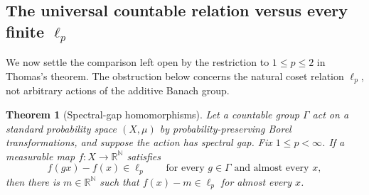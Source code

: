 \documentclass[11pt]{article}
\numberwithin{equation}{section}
\newtheorem{theorem}{Theorem}[section]
\theoremstyle{definition}
\newcommand{\N}{\mathbb N}
\newcommand{\R}{\mathbb R}
\begin{document}
\subsection{The universal countable relation versus every finite \texorpdfstring{$\ell_p$}{ell p}}
\label{sec:finite-p}

We now settle the comparison left open by the restriction to
$1\le p\le2$ in Thomas's theorem. The obstruction below concerns
the natural coset relation $\ell_p$, not arbitrary actions of
the additive Banach group.

\begin{theorem}[Spectral-gap homomorphisms]\label{thm:spectral-homomorphism}
Let a countable group $\Gamma$ act on a standard probability space
$(X,\mu)$ by probability-preserving Borel transformations, and suppose
the action has spectral gap. Fix $1\le p<\infty$.
If a measurable map $f:X\to\R^\N$ satisfies
\[
 f(gx)-f(x)\in\ell_p
 \qquad\text{for every }g\in\Gamma
 \text{ and almost every }x,
\]
then there is $m\in\R^\N$ such that
$f(x)-m\in\ell_p$ for almost every $x$.
\end{theorem}
\end{document}
